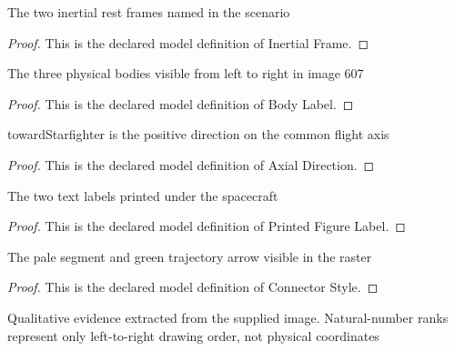 \begin{definition}
  \label{def:physics:phyx-mini-0607:phyxminiproblems-problemphyxmini0607-inertialframe}
  The two inertial rest frames named in the scenario
\end{definition}
\begin{proof}
  This is the declared model definition of Inertial Frame.
\end{proof}
\begin{definition}
  \label{def:physics:phyx-mini-0607:phyxminiproblems-problemphyxmini0607-bodylabel}
  The three physical bodies visible from left to right in image 607
\end{definition}
\begin{proof}
  This is the declared model definition of Body Label.
\end{proof}
\begin{definition}
  \label{def:physics:phyx-mini-0607:phyxminiproblems-problemphyxmini0607-axialdirection}
  towardStarfighter is the positive direction on the common flight axis
\end{definition}
\begin{proof}
  This is the declared model definition of Axial Direction.
\end{proof}
\begin{definition}
  \label{def:physics:phyx-mini-0607:phyxminiproblems-problemphyxmini0607-printedfigurelabel}
  The two text labels printed under the spacecraft
\end{definition}
\begin{proof}
  This is the declared model definition of Printed Figure Label.
\end{proof}
\begin{definition}
  \label{def:physics:phyx-mini-0607:phyxminiproblems-problemphyxmini0607-connectorstyle}
  The pale segment and green trajectory arrow visible in the raster
\end{definition}
\begin{proof}
  This is the declared model definition of Connector Style.
\end{proof}
\begin{definition}
  \label{def:physics:phyx-mini-0607:phyxminiproblems-problemphyxmini0607-spaceshipmissilefigure}
  Qualitative evidence extracted from the supplied image. Natural-number ranks represent only left-to-right drawing order, not physical coordinates
\end{definition}
